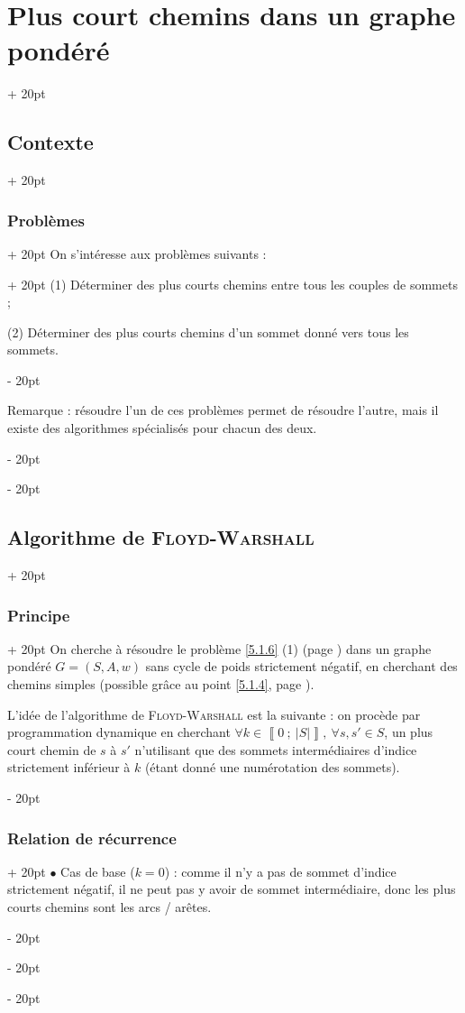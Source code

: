 \documentclass[a4paper, 12pt, twoside]{article}
\newcommand{\nset}[2]{\left\llbracket #1\ ;\ #2 \right\rrbracket}
\newcommand{\abs}[1]{\left\lvert #1 \right\rvert}
\newcommand{\ind}[1][20pt]{\advance\leftskip + #1}
\newcommand{\deind}[1][20pt]{\advance\leftskip - #1}
\newenvironment{indt}[2][20pt]{#2 \par \ind[#1]}{\par \deind} %
\begin{document}
\begin{indt}{\section{Plus court chemins dans un graphe pondéré}}
\begin{indt}{\subsection{Contexte}}
\begin{indt}{\subsubsection{Problèmes}}
                \begin{indt}{On s'intéresse aux problèmes suivants :}
                    (1) Déterminer des plus courts chemins entre tous les couples de sommets ;

                    (2) Déterminer des plus courts chemins d'un sommet donné vers tous les sommets.
                \end{indt}
                
                \vspace{6pt}

                Remarque : résoudre l'un de ces problèmes permet de résoudre l'autre, mais il existe des algorithmes spécialisés pour chacun des deux.
            \end{indt}
        \end{indt}

        \vspace{12pt}
        
        \begin{indt}{\subsection{Algorithme de \textsc{Floyd-Warshall}}}
            \begin{indt}{\subsubsection{Principe}}
                On cherche à résoudre le problème \ref{5.1.6} (1) (page \pageref{5.1.6}) dans un graphe pondéré $G = (S, A, w)$ sans cycle de poids strictement négatif, en cherchant des chemins simples (possible grâce au point \ref{5.1.4}, page \pageref{5.1.4}).

                L'idée de l'algorithme de \textsc{Floyd-Warshall} est la suivante : on procède par programmation dynamique en cherchant $\forall k \in \nset 0 {\abs S},\ \forall s, s' \in S$, un plus court chemin de $s$ à $s'$ n'utilisant que des sommets intermédiaires d'indice strictement inférieur à $k$ (étant donné une numérotation des sommets).
            \end{indt}

            \vspace{12pt}
            
            \begin{indt}{\subsubsection{Relation de récurrence}}
                $\bullet$ Cas de base ($k = 0$) : comme il n'y a pas de sommet d'indice strictement négatif, il ne peut pas y avoir de sommet intermédiaire, donc les plus courts chemins sont les arcs / arêtes.


\end{indt}
\end{indt}
\end{indt}
\end{document}
